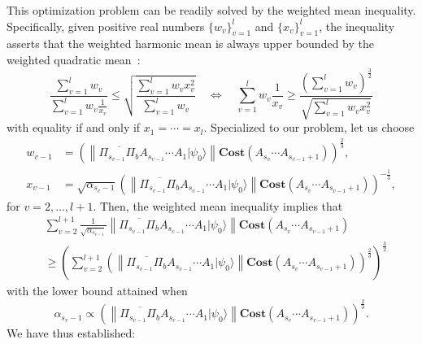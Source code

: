 \documentclass[letterpaper,onecolumn,11pt,accepted=2026-02-14]{quantumarticle}
\newcommand{\norm}[1]{\left\lVert#1\right\rVert}
\theoremstyle{remark}
\theoremstyle{plain}
\newcommand{\ket}[1]{|#1\rangle}
\begin{document}
This optimization problem can be readily solved by the weighted mean inequality. Specifically, given positive real numbers $\{w_v\}_{v=1}^l$ and $\{x_v\}_{v=1}^l$, the inequality asserts that the weighted harmonic mean is always upper bounded by the weighted quadratic mean~\cite[Problem 8.3]{steele2004cauchy}:
\begin{equation}
    \frac{\sum\limits_{v=1}^{l}w_v}{\sum\limits_{v=1}^{l}w_v\frac{1}{x_v}}
    \leq\sqrt{\frac{\sum\limits_{v=1}^{l}w_vx_v^2}{\sum\limits_{v=1}^{l}w_v}}
    \quad\Leftrightarrow\quad
    \sum\limits_{v=1}^{l}w_v\frac{1}{x_v}\geq\frac{\left(\sum\limits_{v=1}^{l}w_v\right)^{\frac{3}{2}}}{\sqrt{\sum\limits_{v=1}^{l}w_vx_v^2}}
\end{equation}
with equality if and only if $x_1=\cdots=x_{l}$. Specialized to our problem, let us choose 
\begin{equation}
\begin{aligned}
    w_{v-1}&=\left(\norm{\overline{\Pi_{s_{v-1}}\Pi_b}A_{s_{v-1}}\cdots A_1\ket{\psi_0}}\mathbf{Cost}\left(A_{s_v}\cdots A_{s_{v-1}+1}\right)\right)^{\frac{2}{3}},\\
    x_{v-1}&=
    \sqrt{\alpha_{s_v-1}}\left(\norm{\overline{\Pi_{s_{v-1}}\Pi_b}A_{s_{v-1}}\cdots A_1\ket{\psi_0}}\mathbf{Cost}\left(A_{s_v}\cdots A_{s_{v-1}+1}\right)\right)^{-\frac{1}{3}},
\end{aligned}
\end{equation}
for $v=2,\ldots,l+1$.
Then, the weighted mean inequality implies that
\begin{equation}
\begin{aligned}
    &\sum_{v=2}^{l+1}\frac{1}{\sqrt{\alpha_{s_{v-1}}}}
    \norm{\overline{\Pi_{s_{v-1}}\Pi_b}A_{s_{v-1}}\cdots A_1\ket{\psi_0}}\mathbf{Cost}\left(A_{s_v}\cdots A_{s_{v-1}+1}\right)\\
    &\geq\left(\sum_{v=2}^{l+1}
    \left(\norm{\overline{\Pi_{s_{v-1}}\Pi_b}A_{s_{v-1}}\cdots A_1\ket{\psi_0}}\mathbf{Cost}\left(A_{s_v}\cdots A_{s_{v-1}+1}\right)\right)^{\frac{2}{3}}\right)^{\frac{3}{2}}
\end{aligned}
\end{equation}
with the lower bound attained when
\begin{equation}
    \alpha_{s_v-1}\propto
    \left(\norm{\overline{\Pi_{s_{v-1}}\Pi_b}A_{s_{v-1}}\cdots A_1\ket{\psi_0}}\mathbf{Cost}\left(A_{s_v}\cdots A_{s_{v-1}+1}\right)\right)^{\frac{2}{3}}.
\end{equation}
We have thus established:
\end{document}

